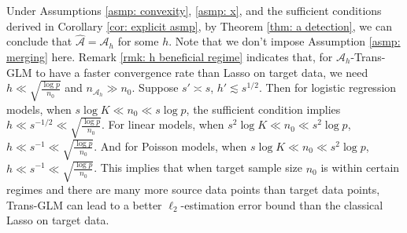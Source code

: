 \documentclass[12pt]{article}
\newcommand{\ma}{\mathcal{A}}
\newcommand{\mah}{\mathcal{A}_h}
\newcommand{\nah}{n_{\mathcal{A}_h}}
\newcommand{\<}{\langle}
\renewcommand{\>}{\rangle}
\begin{document}
Under Assumptions \ref{asmp: convexity}, \ref{asmp: x}, and the sufficient conditions derived  in Corollary \ref{cor: explicit asmp}, by Theorem \ref{thm: a detection}, we can conclude that $\widehat{\ma} = \mah$ for some $h$. Note that we don't impose Assumption \ref{asmp: merging} here. Remark \ref{rmk: h beneficial regime} indicates that, for $\mah$-Trans-GLM to have a faster convergence rate than Lasso on target data, we need $h \ll \sqrt{\frac{\log p}{n_0}}$ and $\nah \gg n_0$. Suppose $s' \asymp s$, $h' \lesssim s^{1/2}$. Then for logistic regression models, when $s\log K \ll n_0 \ll s\log p$, the sufficient condition implies $h \ll s^{-1/2} \ll \sqrt{\frac{\log p}{n_0}}$. For linear models, when $s^2\log K \ll n_0 \ll s^2\log p$, $h \ll s^{-1} \ll \sqrt{\frac{\log p}{n_0}}$. And for Poisson models, when $s\log K \ll n_0 \ll s^2\log p$, $h \ll s^{-1} \ll \sqrt{\frac{\log p}{n_0}}$. This implies that when target sample size $n_0$ is within certain regimes and there are many more source data points than target data points, Trans-GLM can lead to a better $\ell_2$-estimation error bound than the classical Lasso on target data.



\end{document}

